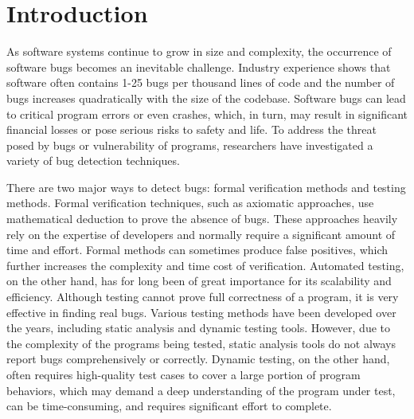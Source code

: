 \chapter{\label{cha:intro}Introduction}


As software systems continue to grow in size and complexity, the occurrence of software bugs becomes an inevitable challenge. Industry experience shows that software often contains 1-25 bugs per thousand lines of code\cite{code-complete} and the number of bugs increases quadratically with the size of the codebase\cite{month}. Software bugs can lead to critical program errors or even crashes, which, in turn, may result in significant financial losses\cite{bug4} or pose serious risks to safety and life\cite{bug1, bug2, bug3}. To address the threat posed by bugs or vulnerability of programs, researchers have investigated a variety of bug detection techniques. 

There are two major ways to detect bugs: formal verification methods and testing methods. Formal verification techniques, such as axiomatic approaches, use mathematical deduction to prove the absence of bugs. These approaches heavily rely on the expertise of developers and normally require a significant amount of time and effort\cite{sel4}. Formal methods can sometimes produce false positives, which further increases the complexity and time cost of verification.
Automated testing, on the other hand, has for long been of great importance for its scalability and efficiency. Although testing cannot prove full correctness of a program, it is very effective in finding real bugs. Various testing methods have been developed over the years, including static analysis\cite{infer, RacerD} and dynamic testing tools\cite{ASAN, TSAN}. However, due to the complexity of the programs being tested, static analysis tools do not always report bugs comprehensively or correctly. Dynamic testing, on the other hand, often requires high-quality test cases to cover a large portion of program behaviors, which may demand a deep understanding of the program under test, can be time-consuming, and requires significant effort to complete.


